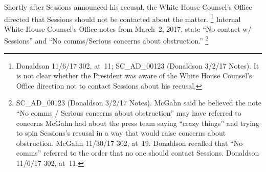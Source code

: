 Shortly after Sessions announced his recusal, the White House Counsel's Office directed that Sessions should not be contacted about the matter.%
\footnote{Donaldson 11/6/17 302, at~11;
SC\_AD\_00123 (Donaldson 3/2/17 Notes).
It is not clear whether the President was aware of the White House Counsel's Office direction not to contact Sessions about his recusal.}
Internal White House Counsel's Office notes from March~2, 2017, state ``No contact w/ Sessions'' and ``No comms/Serious concerns about obstruction.''%
\footnote{SC\_AD\_00123 (Donaldson 3/2/17 Notes).
McGahn said he believed the note ``No comms / Serious concerns about obstruction'' may have referred to concerns McGahn had about the press team saying ``crazy things'' and trying to spin Sessions's recusal in a way that would raise concerns about obstruction.
McGahn 11/30/17 302, at~19.
Donaldson recalled that ``No comms'' referred to the order that no one should contact Sessions.
Donaldson 11/6/17 302, at~11.}

